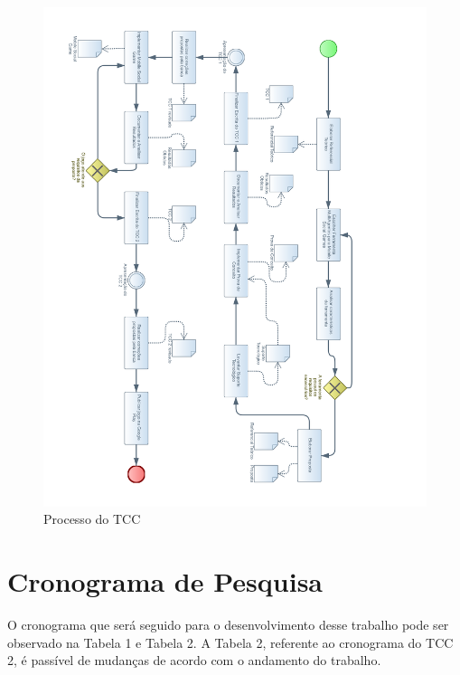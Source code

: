 \begin{figure}[H]
  \centering
  \includegraphics[width=16cm]{figuras/diagram}
  \caption{Processo do TCC}
  \label{figura:diagram}
\end{figure}


\section{Cronograma de Pesquisa}

O cronograma que será seguido para o desenvolvimento desse trabalho pode ser observado na Tabela 1 e Tabela 2. A Tabela 2, referente ao cronograma do TCC 2, é passível de mudanças de acordo com o andamento do trabalho.

